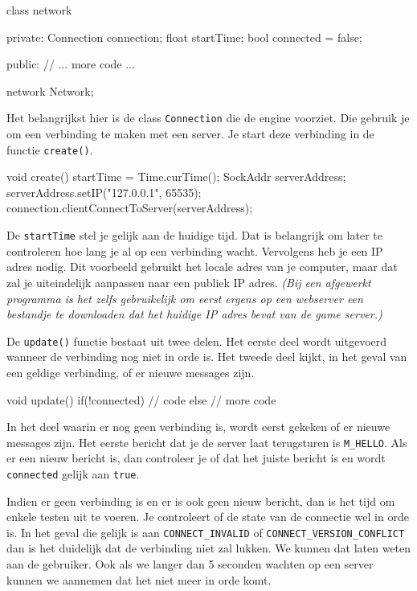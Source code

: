 \begin{code}
class network
{
private:
   Connection connection;
	 float startTime;
	 bool connected = false;
	
public:
   // ... more code ...
}
network Network;
\end{code}

Het belangrijkst hier is de class \texttt{Connection} die de engine voorziet. Die gebruik je om een verbinding te maken met een server. Je start deze verbinding in de functie \texttt{create()}.

\begin{code}
void create()
{
	startTime = Time.curTime();
	SockAddr serverAddress;
	serverAddress.setIP("127.0.0.1", 65535);
	connection.clientConnectToServer(serverAddress);
}
\end{code}

De \texttt{startTime} stel je gelijk aan de huidige tijd. Dat is belangrijk om later te controleren hoe lang je al op een verbinding wacht. Vervolgens heb je een IP adres nodig. Dit voorbeeld gebruikt het locale adres van je computer, maar dat zal je uiteindelijk aanpassen naar een publiek IP adres. \textsl{(Bij een afgewerkt programma is het zelfs gebruikelijk om eerst ergens op een webserver een bestandje te downloaden dat het huidige IP adres bevat van de game server.)}

De \texttt{update()} functie bestaat uit twee delen. Het eerste deel wordt uitgevoerd wanneer de verbinding nog niet in orde is. Het tweede deel kijkt, in het geval van een geldige verbinding, of er nieuwe messages zijn.

\begin{code}
void update()
{
   if(!connected)
	 {
	    // code
	 } else {
	    // more code
	 }
}
\end{code}

In het deel waarin er nog geen verbinding is, wordt eerst gekeken of er nieuwe messages zijn. Het eerste bericht dat je de server laat terugsturen is \texttt{M\_HELLO}. Als er een nieuw bericht is, dan controleer je of dat het juiste bericht is en wordt \texttt{connected} gelijk aan \texttt{true}.

Indien er geen verbinding is en er is ook geen nieuw bericht, dan is het tijd om enkele testen uit te voeren. Je controleert of de state van de connectie wel in orde is. In het geval die gelijk is aan \texttt{CONNECT\_INVALID} of \texttt{CONNECT\_VERSION\_CONFLICT} dan is het duidelijk dat de verbinding niet zal lukken. We kunnen dat laten weten aan de gebruiker. Ook als we langer dan 5 seconden wachten op een server kunnen we aannemen dat het niet meer in orde komt. 


